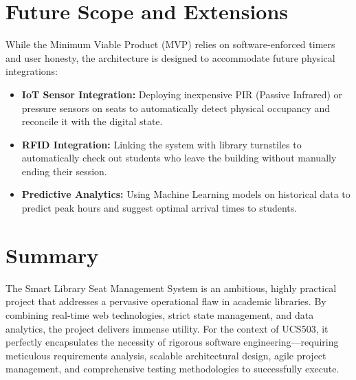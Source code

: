 \documentclass[11pt,a4paper]{article}
\begin{document}
\section{Future Scope and Extensions}
While the Minimum Viable Product (MVP) relies on software-enforced timers and user honesty, the architecture is designed to accommodate future physical integrations:
\begin{itemize}[leftmargin=0.7cm]
    \item \textbf{IoT Sensor Integration:} Deploying inexpensive PIR (Passive Infrared) or pressure sensors on seats to automatically detect physical occupancy and reconcile it with the digital state.
    \item \textbf{RFID Integration:} Linking the system with library turnstiles to automatically check out students who leave the building without manually ending their session.
    \item \textbf{Predictive Analytics:} Using Machine Learning models on historical data to predict peak hours and suggest optimal arrival times to students.
\end{itemize}

\section{Summary}
The Smart Library Seat Management System is an ambitious, highly practical project that addresses a pervasive operational flaw in academic libraries. By combining real-time web technologies, strict state management, and data analytics, the project delivers immense utility. For the context of UCS503, it perfectly encapsulates the necessity of rigorous software engineering—requiring meticulous requirements analysis, scalable architectural design, agile project management, and comprehensive testing methodologies to successfully execute.
\end{document}
